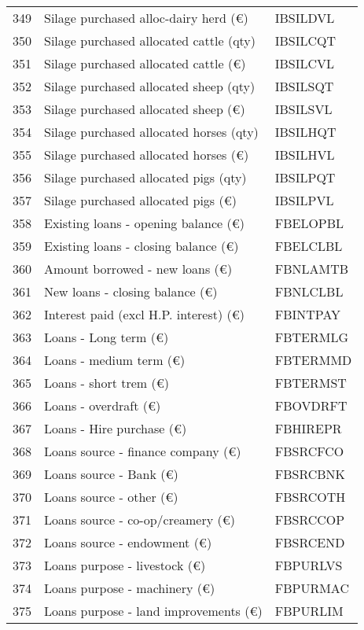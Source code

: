 \documentclass{article}\usepackage{graphicx, color}
\begin{document}
\begin{flushleft}
\begin{table}[ht]
\begin{center}
\begin{tabular}{rll}
  349 & Silage purchased alloc-dairy herd (€) & IBSILDVL \\ 
  350 & Silage purchased allocated cattle (qty) & IBSILCQT \\ 
  351 & Silage purchased allocated cattle (€) & IBSILCVL \\ 
  352 & Silage purchased allocated sheep  (qty) & IBSILSQT \\ 
  353 & Silage purchased allocated sheep  (€) & IBSILSVL \\ 
  354 & Silage purchased allocated horses (qty) & IBSILHQT \\ 
  355 & Silage purchased allocated horses (€) & IBSILHVL \\ 
  356 & Silage purchased allocated pigs   (qty) & IBSILPQT \\ 
  357 & Silage purchased allocated pigs   (€) & IBSILPVL \\ 
  358 & Existing loans - opening balance (€) & FBELOPBL \\ 
  359 & Existing loans - closing balance (€) & FBELCLBL \\ 
  360 & Amount borrowed - new loans      (€) & FBNLAMTB \\ 
  361 & New loans - closing balance      (€) & FBNLCLBL \\ 
  362 & Interest paid (excl H.P. interest) (€) & FBINTPAY \\ 
  363 & Loans - Long term             (€) & FBTERMLG \\ 
  364 & Loans - medium term           (€) & FBTERMMD \\ 
  365 & Loans - short trem            (€) & FBTERMST \\ 
  366 & Loans - overdraft             (€) & FBOVDRFT \\ 
  367 & Loans - Hire purchase         (€) & FBHIREPR \\ 
  368 & Loans source - finance company (€) & FBSRCFCO \\ 
  369 & Loans source - Bank           (€) & FBSRCBNK \\ 
  370 & Loans source - other          (€) & FBSRCOTH \\ 
  371 & Loans source - co-op/creamery (€) & FBSRCCOP \\ 
  372 & Loans source - endowment      (€) & FBSRCEND \\ 
  373 & Loans purpose - livestock     (€) & FBPURLVS \\ 
  374 & Loans purpose - machinery     (€) & FBPURMAC \\ 
  375 & Loans purpose - land improvements (€) & FBPURLIM \\ 

\end{tabular}
\end{center}
\end{table}
\end{flushleft}
\end{document}
